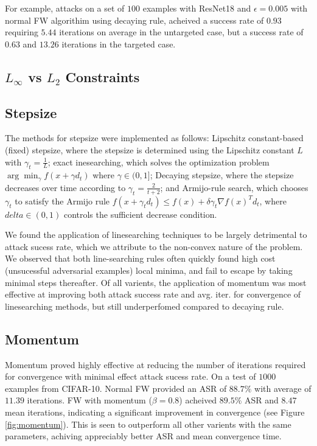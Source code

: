 \documentclass{article}
\begin{document}
For example, attacks on a set of $100$ examples with ResNet18 and $\epsilon = 0.005$ with normal FW algorithim using decaying rule, acheived a success rate of $0.93$ requiring $5.44$ iterations on average in the untargeted case, but a success rate of $0.63$ and $13.26$ iterations in the targeted case.

\subsection{$L_\infty$ vs $L_2$ Constraints}


\subsection{Stepsize}
The methods for stepsize were implemented as follows: Lipschitz constant-based (fixed) stepsize, where the stepsize is determined using the Lipschitz constant \(L\) with \(\gamma_t = \frac{1}{L}\); exact inesearching, which solves the optimization problem \(\arg \min_{\gamma} f(x + \gamma d_t)\) where \(\gamma \in (0,1]\); Decaying stepsize, where the stepsize decreases over time according to \(\gamma_t = \frac{2}{t + 2}\); and Armijo-rule search, which chooses \(\gamma_t\) to satisfy the Armijo rule \(f(x + \gamma_t d_t) \leq f(x) + \delta \gamma_t \nabla f(x)^T d_t\), where \(delta \in (0,1)\) controls the sufficient decrease condition.

We found the application of linesearching techniques to be largely detrimental to attack sucess rate, which we attribute to the non-convex nature of the problem. We observed that both line-searching rules often quickly found high cost (unsucessful adversarial examples) local minima, and fail to escape by taking minimal steps thereafter. Of all varients, the application of momentum was most effective at improving both attack success rate and avg. iter. for convergence of linesearching methods, but still underperfomed compared to decaying rule.

\subsection{Momentum}

Momentum proved highly effective at reducing the number of iterations required for convergence with minimal effect attack sucess rate. On a test of $1000$ examples from CIFAR-10. Normal FW provided an ASR of $88.7\%$ with average of $11.39$ iterations. FW with momentum ($\beta = 0.8$) acheived $89.5\%$ ASR and $8.47$ mean iterations, indicating a significant improvement in convergence (see Figure \ref{fig:momentum}). This is seen to outperform all other varients with the same parameters, achiving appreciably better ASR and mean convergence time.
\end{document}
